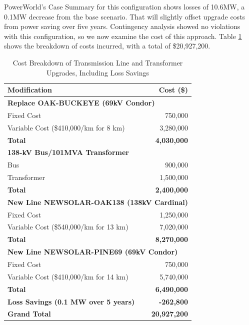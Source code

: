 \documentclass[conference]{IEEEtran}
\begin{document}
PowerWorld's Case Summary for this configuration shows losses of 10.6MW, a 0.1MW decrease from the base scenario. That will slightly offset upgrade costs from power saving over five years. Contingency analysis showed no violations with this configuration, so we now examine the cost of this approach. Table \ref{tab:cost_breakdown_option1} shows the breakdown of costs incurred, with a total of \$20,927,200.
\begin{table}[h!]
	\centering
	\begin{tabular}{|l|r|}
		\hline
		\textbf{Modification} & \textbf{Cost (\$)} \\ \hline
		\multicolumn{2}{|l|}{\textbf{Replace OAK-BUCKEYE (69kV Condor)}} \\ 
		\hspace{1em} Fixed Cost & 750,000 \\ 
		\hspace{1em} Variable Cost (\$410,000/km for 8 km) & 3,280,000 \\ 
		\hspace{1em} \textbf{Total} & \textbf{4,030,000} \\ \hline
		\multicolumn{2}{|l|}{\textbf{138-kV Bus/101MVA Transformer}} \\ 
		\hspace{1em} Bus & 900,000 \\ 
		\hspace{1em} Transformer & 1,500,000 \\ 
		\hspace{1em} \textbf{Total} & \textbf{2,400,000} \\ \hline
		\multicolumn{2}{|l|}{\textbf{New Line NEWSOLAR-OAK138 (138kV Cardinal)}} \\ 
		\hspace{1em} Fixed Cost & 1,250,000 \\ 
		\hspace{1em} Variable Cost (\$540,000/km for 13 km) & 7,020,000 \\ 
		\hspace{1em} \textbf{Total} & \textbf{8,270,000} \\ \hline
		\multicolumn{2}{|l|}{\textbf{New Line NEWSOLAR-PINE69 (69kV Condor)}} \\ 
		\hspace{1em} Fixed Cost & 750,000 \\ 
		\hspace{1em} Variable Cost (\$410,000/km for 14 km) & 5,740,000 \\ 
		\hspace{1em} \textbf{Total} & \textbf{6,490,000} \\ \hline
		\textbf{Loss Savings (0.1 MW over 5 years)} & \textbf{-262,800} \\ \hline
		\textbf{Grand Total} & \textbf{20,927,200} \\ \hline
	\end{tabular}
	\vspace{0.5em}
	\caption{Cost Breakdown of Transmission Line and Transformer Upgrades, Including Loss Savings}
	\label{tab:cost_breakdown_option1}
\end{table}
\end{document}
